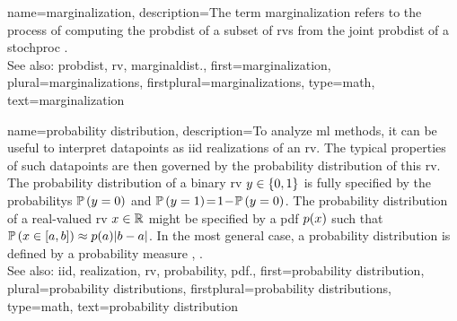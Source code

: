 {name={marginalization}, 
	description={The term marginalization refers to the process of computing the \gls{probdist} 
		of a subset of \glspl{rv} from the joint \gls{probdist} of a \gls{stochproc} 
		\cite{GraphModExpFamVarInfWainJor}.
		\\
		See also: \gls{probdist}, \gls{rv}, \gls{marginaldist}.},
	first={marginalization},
	plural={marginalizations},
	firstplural={marginalizations},
	type=math,
	text={marginalization}
}

{name={probability distribution}, 
	description={To analyze \gls{ml} methods, it can be useful 
		to interpret \glspl{datapoint} as \gls{iid} \glspl{realization} of an \gls{rv}. The typical 
		properties of such \glspl{datapoint} are then governed by the \gls{probability} distribution 
		of this \gls{rv}. The \gls{probability} distribution of a binary \gls{rv} $y \in \{0,1\}$ 
		is fully specified by the \glspl{probability} $\mathbb{P}\left(y = 0\right)$ and 
		$\mathbb{P}\left(y=1\right)\!=\!1\!-\!\mathbb{P}\left(y=0\right)$. The \gls{probability} 
		distribution of a real-valued \gls{rv} $x \in \mathbb{R}$ might be specified 
		by a \gls{pdf} $p(x)$ such that $\mathbb{P}\left( x \in [a,b] \right) \approx  p(a) |b-a|$. 
	    	In the most general case, a \gls{probability} distribution is defined by a \gls{probability} \gls{measure} 
		\cite{BillingsleyProbMeasure}, \cite{GrayProbBook}.
	    		\\
		See also: \gls{iid}, \gls{realization}, \gls{rv}, \gls{probability}, \gls{pdf}.},
	first={probability distribution},
	plural={probability distributions},
	firstplural={probability distributions},
	type=math,
	text={probability distribution}
}

